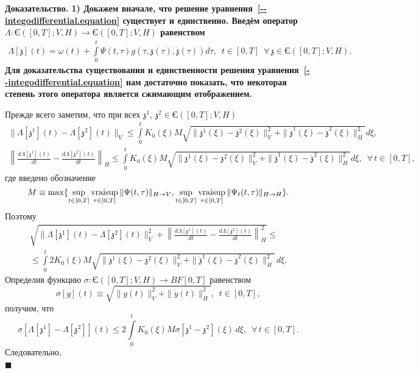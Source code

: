 \documentclass{report}
\newenvironment{Proof}{\par\noindent\bf Доказательство.\rm}{ $\blacksquare$\par}
\newcommand{\vraisup}{\mathop{\rm vraisup}}
\begin{document}
\begin{Proof}
1) Докажем вначале, что решение уравнения~\eqref{--integodifferential.equation} существует и единственно. Введём оператор $\Lambda:\textrm{Є}([0,T];V,H)\to\textrm{Є}([0,T];V,H)$ равенством
\begin{gather*}
\Lambda[\mathfrak{z}](t)=\omega(t)+\int\limits_0^t\Psi(t,\tau)g(\tau,\mathfrak{z}(\tau),\dot{\mathfrak{z}}(\tau))d\tau,\,\,\,t\in[0,T]\,\,\,\forall\,\mathfrak{z}\in\textrm{Є}([0,T];V,H).
\end{gather*}
Для доказательства существования и единственности решения уравнения~\eqref{--integodifferential.equation} нам достаточно показать, что некоторая степень этого оператора является сжимающим
отображением.

Прежде всего заметим, что при всех $\mathfrak{z}^1$, $\mathfrak{z}^2\in\textrm{Є}([0,T];V,H)$
\begin{gather*}
\|\Lambda[\mathfrak{z}^1](t)-\Lambda[\mathfrak{z}^2](t)\|_V\leqslant\int\limits_{0}^t K_0(\xi)M
\sqrt{\|\mathfrak{z}^1(\xi)-\mathfrak{z}^2(\xi)\|^2_V+\|\dot{\mathfrak{z}}^1(\xi)-\dot{\mathfrak{z}}^2(\xi)\|^2_H}d\xi,\\
\left\|\frac{d\Lambda[\mathfrak{z}^1](t)}{dt}-\frac{d\Lambda[\mathfrak{z}^2](t)}{dt}\right\|_H\leqslant\int\limits_{0}^t K_0(\xi)M
\sqrt{\|\mathfrak{z}^1(\xi)-\mathfrak{z}^2(\xi)\|^2_V+\|\dot{\mathfrak{z}}^1(\xi)-\dot{\mathfrak{z}}^2(\xi)\|^2_H}d\xi,\,\,\,\forall\,t\in[0,T],
\end{gather*}
где введено обозначение
$$
M\equiv\max\{\sup\limits_{t\in[0,T]}\vraisup\limits_{\tau\in[0,T]}\|\Psi(t,\tau)\|_{H\to V},
\sup\limits_{t\in[0,T]}\vraisup\limits_{\tau\in[0,T]}\|\Psi_t(t,\tau)\|_{H\to H}\}.
$$
Поэтому
\begin{gather*}
\sqrt{\|\Lambda[\mathfrak{z}^1](t)-\Lambda[\mathfrak{z}^2](t)\|_V^2+ \left\|\frac{d\Lambda[\mathfrak{z}^1](t)}{dt}-\frac{d\Lambda[\mathfrak{z}^2](t)}{dt}\right\|_H^2}\leqslant\\
\leqslant\int\limits_{0}^t2K_0(\xi)M\sqrt{\|\mathfrak{z}^1(\xi)-\mathfrak{z}^2(\xi)\|^2_V+\|\dot{\mathfrak{z}}^1(\xi)-\dot{\mathfrak{z}}^2(\xi)\|^2_H}\,d\xi.
\end{gather*}
Определив функцию $\sigma\colon\textrm{Є}([0,T];V,H)\to BF[0,T]$ равенством $$\sigma[y](t)\equiv\sqrt{\|y(t)\|^2_V+\|\dot y(t)\|^2_H},\,\,\,t\in[0,T],$$ получим, что
$$
\sigma[\Lambda[\mathfrak{z}^1]-\Lambda[\mathfrak{z}^2]](t)\leqslant2\int\limits_{0}^tK_0(\xi)M\sigma[\mathfrak{z}^1-\mathfrak{z}^2](\xi)\,d\xi,\,\,\,\forall\,t\in[0,T].
$$
Следовательно,
\begin{gather*}

\end{gather*}
\end{Proof}
\end{document}
